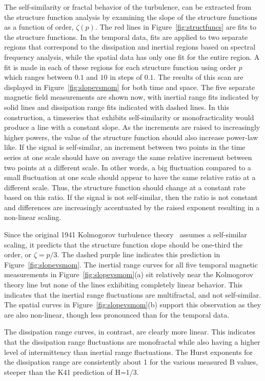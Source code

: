 \documentclass[preprint2]{aastex}
\begin{document}
The self-similarity or fractal behavior of the turbulence, can be extracted from the structure function analysis by examining the slope of the structure functions as a function of order, $\zeta(p)$. The red lines in Figure~\ref{fig:structfuncs} are fits to the structure functions. In the temporal data, fits are applied to two separate regions that correspond to the dissipation and inertial regions based on spectral frequency analysis, while the spatial data has only one fit for the entire region. A fit is made in each of these regions for each structure function using order $p$ which ranges between $0.1$ and $10$ in steps of $0.1$. The results of this scan are displayed in Figure~\ref{fig:slopevsmom} for both time and space. The five separate magnetic field measurements are shown now, with inertial range fits indicated by solid lines and dissipation range fits indicated with dashed lines. In this construction, a timeseries that exhibits self-similarity or monofracticality would produce a line with a constant slope. As the increments are raised to increasingly higher powers, the value of the structure function should also increase power-law like. If the signal is self-similar, an increment between two points in the time series at one scale should have on average the same relative increment between two points at a different scale. In other words, a big fluctuation compared to a small fluctuation at one scale should appear to have the same relative ratio at a different scale. Thus, the structure function should change at a constant rate based on this ratio. If the signal is not self-similar, then the ratio is not constant and differences are increasingly accentuated by the raised exponent resulting in a non-linear scaling.

Since the original 1941 Kolmogorov turbulence theory~\citep{kolmogorov1941} assumes a self-similar scaling, it predicts that the structure function slope should be one-third the order, or $\zeta = p/3$. The dashed purple line indicates this prediction in Figure~\ref{fig:slopevsmom}. The inertial range curves for all five temporal magnetic measurements in Figure~\ref{fig:slopevsmom}(a) sit relatively near the Kolmogorov theory line but none of the lines exhibiting completely linear behavior. This indicates that the inertial range fluctuations are multifractal, and not self-similar. The spatial curves in Figure~\ref{fig:slopevsmom}(b) support this observation as they are also non-linear, though less pronounced than for the temporal data.

The dissipation range curves, in contrast, are clearly more linear. This indicates that the dissipation range fluctuations are monofractal while also having a higher level of intermittency than inertial range fluctuations. The Hurst exponents for the dissipation range are consistently about 1 for the various measured B values, steeper than the K41 prediction of H=1/3.
\end{document}
